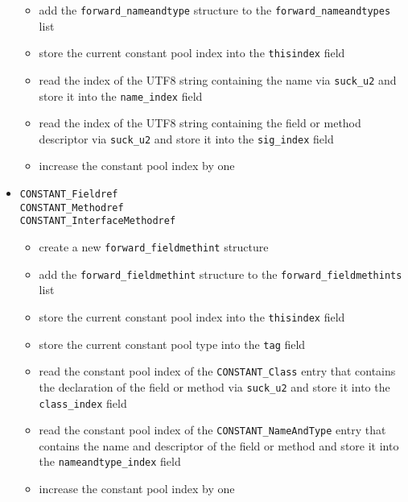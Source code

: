 \begin{itemize}
\begin{itemize}
  \item add the \texttt{forward\_nameandtype} structure to the
  \texttt{forward\_nameandtypes} list

  \item store the current constant pool index into the
  \texttt{thisindex} field

  \item read the index of the UTF8 string containing the name via
  \texttt{suck\_u2} and store it into the \texttt{name\_index} field

  \item read the index of the UTF8 string containing the field or
  method descriptor via \texttt{suck\_u2} and store it into the
  \texttt{sig\_index} field

  \item increase the constant pool index by one
 \end{itemize}

 \item \texttt{CONSTANT\_Fieldref} \\ \texttt{CONSTANT\_Methodref} \\
 \texttt{CONSTANT\_InterfaceMethodref}

 \begin{itemize}
  \item create a new \texttt{forward\_fieldmethint} structure

  \item add the \texttt{forward\_fieldmethint} structure to the
  \texttt{forward\_fieldmethints} list

  \item store the current constant pool index into the
  \texttt{thisindex} field

  \item store the current constant pool type into the \texttt{tag}
  field

  \item read the constant pool index of the \texttt{CONSTANT\_Class}
  entry that contains the declaration of the field or method via
  \texttt{suck\_u2} and store it into the \texttt{class\_index} field

  \item read the constant pool index of the
  \texttt{CONSTANT\_NameAndType} entry that contains the name and
  descriptor of the field or method and store it into the
  \texttt{nameandtype\_index} field

  \item increase the constant pool index by one

 \end{itemize}

\end{itemize}

